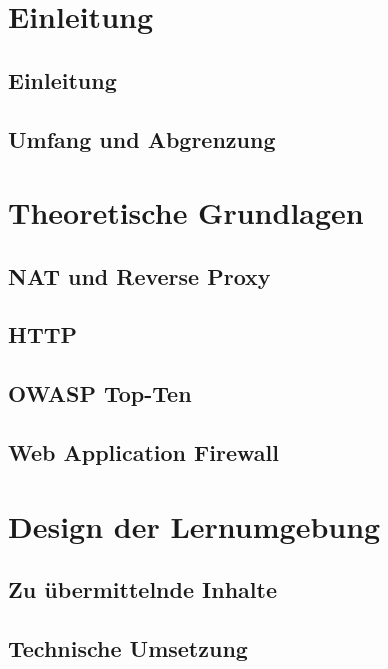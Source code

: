 \documentclass[a4paper, 11pt]{article}
\begin{document}
    
    
    

    \section{Einleitung}
    \subsection{Einleitung}
    
    \subsection{Umfang und Abgrenzung}
    
    \pagebreak

    \section{Theoretische Grundlagen}
    \subsection{NAT und Reverse Proxy}
    
    \subsection{HTTP}
    
    \subsection{OWASP Top-Ten}
    
    \subsection{Web Application Firewall}
    
    \pagebreak

    \section{Design der Lernumgebung}
    \subsection{Zu übermittelnde Inhalte}
    \label{chap:inhalte}
    
    \subsection{Technische Umsetzung}
    
\end{document}
